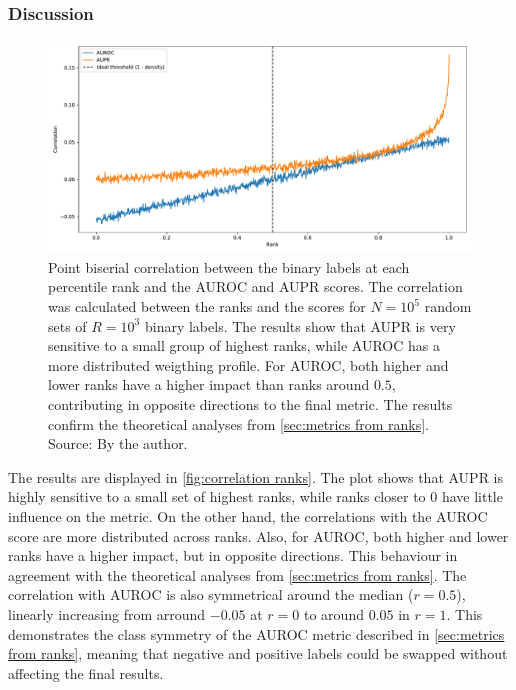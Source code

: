 \subsubsection{Discussion}

\begin{figure}[tb]
    \includegraphics[width=\textwidth]{
        experiments/theoretical_scoring/results/rank_correlation.pdf
    }
    \caption{
        Point biserial correlation between the binary labels at each percentile rank and the AUROC and AUPR scores. The correlation was calculated between the ranks and the scores for $N=10^5$ random sets of $R=10^3$ binary labels. The results show that AUPR is very sensitive to a small group of highest ranks, while AUROC has a more distributed weigthing profile. For AUROC, both higher and lower ranks have a higher impact than ranks around $0.5$, contributing in opposite directions to the final metric. The results confirm the theoretical analyses from \autoref{sec:metrics from ranks}.
        \newline Source: By the author.
    }
    \label{fig:correlation ranks}
\end{figure}

The results are displayed in \autoref{fig:correlation ranks}.
%
The plot shows that AUPR is highly sensitive to a small set of highest ranks, while ranks closer to $0$ have little influence on the metric. On the other hand, the correlations with the AUROC score are more distributed across ranks. Also, for AUROC, both higher and lower ranks have a higher impact, but in opposite directions.
This behaviour in agreement with the theoretical analyses from \autoref{sec:metrics from ranks}.
The correlation with AUROC is also symmetrical around the median ($r=0.5$), linearly increasing from arround $-0.05$ at $r=0$ to around $0.05$ in $r=1$. This demonstrates the class symmetry of the AUROC metric described in \autoref{sec:metrics from ranks}, meaning that negative and positive labels could be swapped without affecting the final results.

